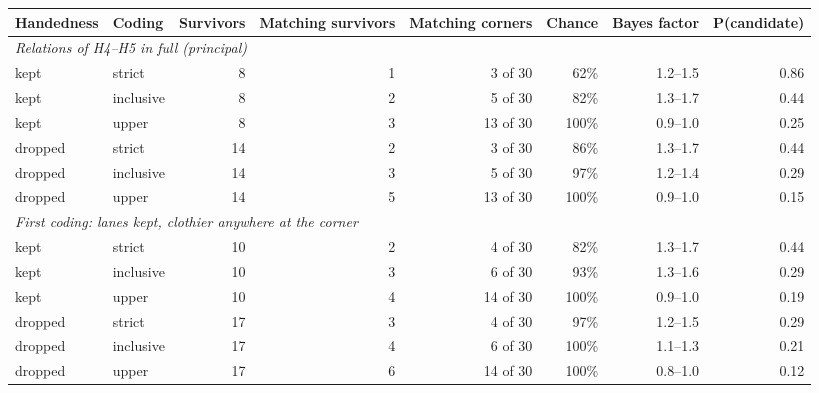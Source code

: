 \begin{tabular}{llrrrrrr}
\toprule
Handedness & Coding & Survivors & Matching survivors & Matching corners & Chance & Bayes factor & P(candidate) \\
\midrule
\multicolumn{8}{l}{\emph{Relations of H4--H5 in full (principal)}} \\
\midrule
kept & strict & 8 & 1 & 3 of 30 & 62\% & 1.2--1.5 & 0.86 \\
kept & inclusive & 8 & 2 & 5 of 30 & 82\% & 1.3--1.7 & 0.44 \\
kept & upper & 8 & 3 & 13 of 30 & 100\% & 0.9--1.0 & 0.25 \\
dropped & strict & 14 & 2 & 3 of 30 & 86\% & 1.3--1.7 & 0.44 \\
dropped & inclusive & 14 & 3 & 5 of 30 & 97\% & 1.2--1.4 & 0.29 \\
dropped & upper & 14 & 5 & 13 of 30 & 100\% & 0.9--1.0 & 0.15 \\
\midrule
\multicolumn{8}{l}{\emph{First coding: lanes kept, clothier anywhere at the corner}} \\
\midrule
kept & strict & 10 & 2 & 4 of 30 & 82\% & 1.3--1.7 & 0.44 \\
kept & inclusive & 10 & 3 & 6 of 30 & 93\% & 1.3--1.6 & 0.29 \\
kept & upper & 10 & 4 & 14 of 30 & 100\% & 0.9--1.0 & 0.19 \\
dropped & strict & 17 & 3 & 4 of 30 & 97\% & 1.2--1.5 & 0.29 \\
dropped & inclusive & 17 & 4 & 6 of 30 & 100\% & 1.1--1.3 & 0.21 \\
dropped & upper & 17 & 6 & 14 of 30 & 100\% & 0.8--1.0 & 0.12 \\
\bottomrule
\end{tabular}
